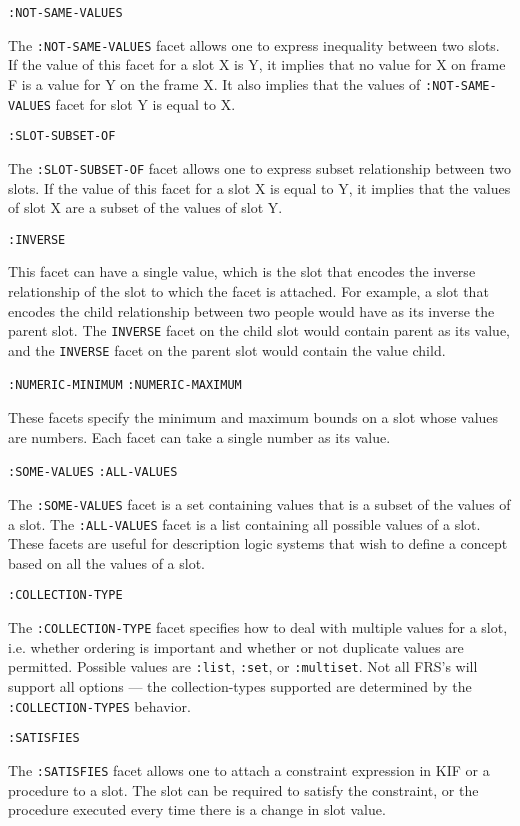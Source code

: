{\tt :NOT-SAME-VALUES}

The {\tt :NOT-SAME-VALUES} facet allows one to express inequality
between two slots.  If the value of this facet for a slot X is Y, it
implies that no value for X on frame F is a value for Y on the frame
X.  It also implies that the values of {\tt :NOT-SAME-VALUES} facet
for slot Y is equal to X.

{\tt :SLOT-SUBSET-OF}

The {\tt :SLOT-SUBSET-OF} facet allows one to express subset relationship between
two slots.  If the value of this facet for a slot X is equal to Y,
it implies that the values of slot X are a subset of the values of slot Y.

{\tt :INVERSE}

This facet can have a single value, which is the slot that encodes
the inverse relationship of the slot to which the facet is attached.
For example, a slot that encodes the child relationship between two
people would have as its inverse the parent slot.  The {\tt INVERSE}
facet on the child slot would contain parent as its value, and
the {\tt INVERSE} facet on the parent slot would contain the value
child.


{\tt :NUMERIC-MINIMUM} \hspace{.3 in}
{\tt :NUMERIC-MAXIMUM}

These facets specify the minimum and maximum bounds on a slot
whose values are numbers.  Each facet can take a single number
as its value.


{\tt :SOME-VALUES}
{\tt :ALL-VALUES}

The {\tt :SOME-VALUES} facet is a set containing values that is a
subset of the values of a slot.  The {\tt :ALL-VALUES} facet is a list
containing all possible values of a slot.  These facets are useful for
description logic systems that wish to define a concept based on all
the values of a slot.

{\tt :COLLECTION-TYPE}

The {\tt :COLLECTION-TYPE} facet specifies how to deal with multiple
values for a slot, i.e. whether ordering is important and whether or
not duplicate values are permitted.  Possible values are {\tt :list},
{\tt :set}, or {\tt :multiset}.  Not all FRS's will support all
options --- the collection-types supported are determined by the {\tt
:COLLECTION-TYPES} behavior.

{\tt :SATISFIES}

The {\tt :SATISFIES} facet allows one to attach a constraint 
expression in KIF or a procedure to a slot.  The slot can be required to satisfy
the constraint, or the procedure executed every time there is a change in
slot value.


